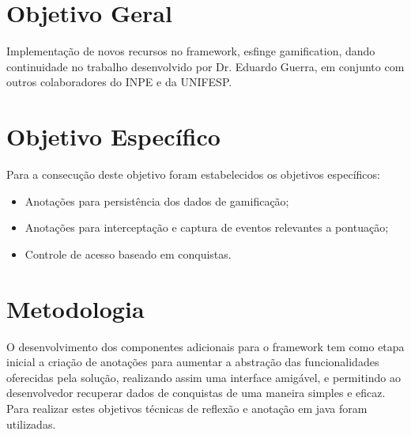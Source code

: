 \section{Objetivo Geral}

\par Implementação de novos recursos no framework, esfinge gamification, dando continuidade no trabalho desenvolvido por Dr. Eduardo Guerra, em conjunto com outros colaboradores do INPE e da UNIFESP. 

\section{Objetivo Espec\'ifico}

\par Para a consecução deste objetivo foram estabelecidos os objetivos específicos:
\begin{itemize}
    \item Anotações para persistência dos dados de gamificação;
    \item Anotações para interceptação e captura de eventos relevantes a pontuação;
    \item Controle de acesso baseado em conquistas.
\end{itemize}

\section{Metodologia}

\par O desenvolvimento dos componentes adicionais para o framework tem como etapa inicial a criação de anotações para aumentar a abstração das funcionalidades oferecidas pela solução, realizando assim uma interface amigável, e permitindo ao desenvolvedor recuperar dados de conquistas de uma maneira simples e eficaz. Para realizar estes objetivos técnicas de reflexão e anotação em java foram utilizadas.